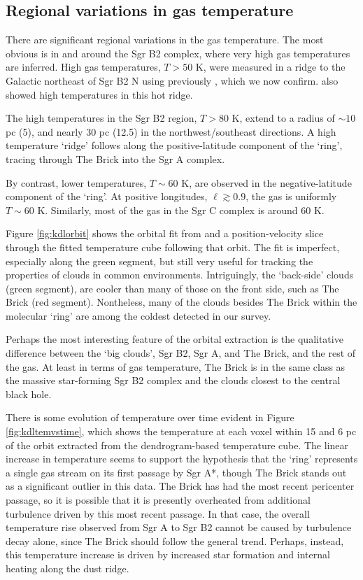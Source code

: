 \subsection{Regional variations in gas temperature}
There are significant regional variations in the gas temperature.  The most
obvious is in and around the Sgr B2 complex, where very high gas temperatures
are inferred.  High gas temperatures, $T>50$ K, were measured in a ridge to the
Galactic northeast of Sgr B2 N using \methylcyanide previously \citep[][Figure
4b]{de-Vicente1997a}, which we now confirm.  \citet{Ott2014a} also showed high
\ammonia temperatures in this hot ridge.

The high temperatures in the Sgr B2 region, $T>80$ K, extend to a radius of
$\sim10$ pc (5\arcmin), and nearly 30 pc (12.5\arcmin) in the
northwest/southeast directions.  A high temperature `ridge' follows along the
positive-latitude component of the \citet{Molinari2011a} `ring', tracing
through The Brick into the Sgr A complex.

By contrast, lower temperatures, $T\sim60$ K, are observed in the
negative-latitude component of the `ring'.  At positive longitudes,
$\ell\gtrsim0.9$, the gas is uniformly $T\sim60$ K.  Similarly, most of the gas
in the Sgr C complex is around 60 K.

Figure \ref{fig:kdlorbit} shows the orbital fit from \citet{Kruijssen2014d} and
a position-velocity slice through the fitted temperature cube following that
orbit.  The fit is imperfect, especially along the green segment, but still very useful
for tracking the properties of clouds in common environments.
Intriguingly, the `back-side' clouds (green segment), are cooler than
many of those on the front side, such as The Brick (red segment).  Nontheless,
many of the clouds besides The Brick within the molecular `ring' are among the
coldest detected in our survey.

Perhaps the most interesting feature of the orbital extraction is the qualitative
difference between the `big clouds', Sgr B2, Sgr A, and The Brick, and the rest
of the gas.  At least in terms of gas temperature, The Brick is in the same class
as the massive star-forming Sgr B2 complex and the clouds closest to the central
black hole.

There is some evolution of temperature over time evident in Figure
\ref{fig:kdltemvstime}, which shows the temperature at each voxel within 15
\kms and 6 pc of the \citet{Kruijssen2014d} orbit extracted from the
dendrogram-based temperature cube.  The linear increase in temperature seems to
support the \citet{Kruijssen2014d} hypothesis that the `ring' represents a
single gas stream on its first passage by Sgr A*, though The Brick stands out
as a significant outlier in this data.  The Brick has had the most recent
pericenter passage, so it is possible that it is presently overheated from
additional turbulence driven by this most recent passage.  In that case, the
overall temperature rise observed from Sgr A to Sgr B2 cannot be caused by
turbulence decay alone, since The Brick should follow the general trend.
Perhaps, instead, this temperature increase is driven by increased star
formation and internal heating along the dust ridge.

